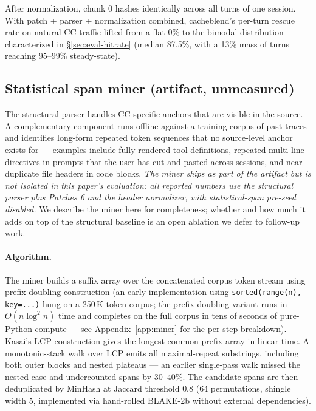 After normalization, chunk 0 hashes identically across all turns of one
session. With patch + parser + normalization combined, cacheblend's
per-turn rescue rate on natural CC traffic lifted from a flat 0\% to
the bimodal distribution characterized in \S\ref{sec:eval-hitrate}
(median 87.5\%, with a 13\% mass of turns reaching 95--99\%
steady-state).

\subsection{Statistical span miner (artifact, unmeasured)}
\label{sec:miner}

The structural parser handles CC-specific anchors that are visible in
the source. A complementary component runs offline against a training
corpus of past traces and identifies long-form repeated token
sequences that no source-level anchor exists for --- examples include
fully-rendered tool definitions, repeated multi-line directives in
prompts that the user has cut-and-pasted across sessions, and
near-duplicate file headers in code blocks. \emph{The miner ships as
part of the \sys{} artifact but is not isolated in this paper's
evaluation: all reported numbers use the structural parser plus
Patches 6 and the header normalizer, with statistical-span pre-seed
disabled.} We describe the miner here for completeness; whether and
how much it adds on top of the structural baseline is an open
ablation we defer to follow-up work.

\paragraph{Algorithm.} The miner builds a suffix array over the
concatenated corpus token stream using prefix-doubling construction
(an early implementation using \texttt{sorted(range(n), key=...)} hung
on a 250\,K-token corpus; the prefix-doubling variant runs in
$O(n \log^2 n)$ time and completes on the full \dataset{} corpus in
tens of seconds of pure-Python compute --- see
Appendix~\ref{app:miner} for the per-step breakdown). Kasai's LCP
construction gives the longest-common-prefix array in linear time.
A monotonic-stack walk over LCP emits all maximal-repeat substrings,
including both outer blocks and nested plateaus --- an earlier
single-pass walk missed the nested case and undercounted spans by
30--40\%. The candidate spans are then deduplicated by MinHash at
Jaccard threshold $0.8$ (64 permutations, shingle width 5,
implemented via hand-rolled BLAKE-2b without external dependencies).

